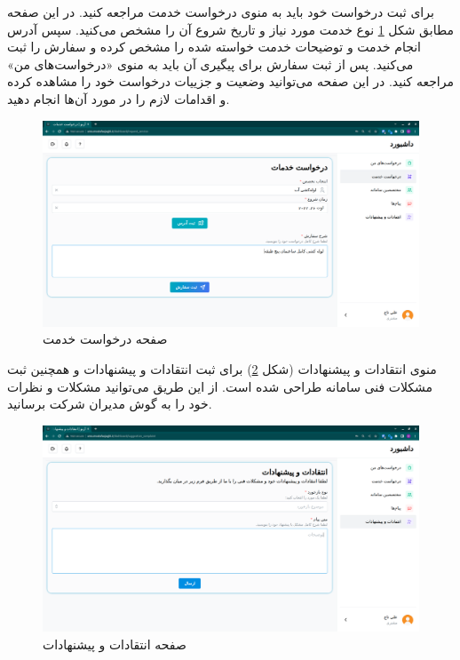 برای ثبت درخواست خود باید به منوی درخواست خدمت مراجعه کنید.
در این صفحه مطابق شکل \ref{customer-request} نوع خدمت مورد نیاز و تاریخ شروع آن را مشخص می‌کنید.
سپس آدرس انجام خدمت و توضیحات خدمت خواسته شده را مشخص کرده و سفارش را ثبت می‌کنید.
پس از ثبت سفارش برای پیگیری آن باید به منوی «درخواست‌های من» مراجعه کنید.
در این صفحه می‌توانید وضعیت و جزییات درخواست خود را مشاهده کرده و اقدامات لازم را در مورد آن‌ها انجام دهید.

\begin{figure}[h]
	\centering
	\includegraphics[width=\textwidth]{figs/user-guide/customer-request}
	\caption{صفحه درخواست خدمت}
	\label{customer-request}
\end{figure}

منوی انتقادات و پیشنهادات (شکل \ref{customer-technical-feedback}) برای ثبت انتقادات و پیشنهادات و همچنین ثبت مشکلات فنی سامانه طراحی شده است.
از این طریق می‌توانید مشکلات و نظرات خود را به گوش مدیران شرکت برسانید.

\begin{figure}[h]
	\centering
	\includegraphics[width=\textwidth]{figs/user-guide/customer-technical-feedback}
	\caption{صفحه انتقادات و پیشنهادات}
	\label{customer-technical-feedback}
\end{figure}

